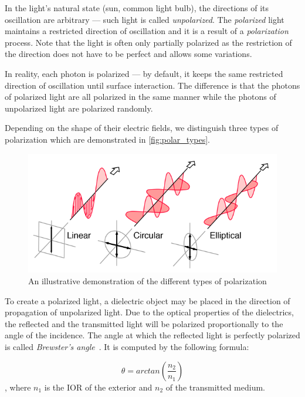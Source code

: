 In the light's natural state (sun, common light bulb), the directions of its oscillation are arbitrary --- such light is called \emph{unpolarized}. The \emph{polarized} light maintains a restricted direction of oscillation and it is a result of a \emph{polarization} process. Note that the light is often only partially polarized as the restriction of the direction does not have to be perfect and allows some variations.

In reality, each photon is polarized --- by default, it keeps the same restricted direction of oscillation until surface interaction. The difference is that the photons of polarized light are all polarized in the same manner while the photons of unpolarized light are polarized randomly. 

Depending on the shape of their electric fields, we distinguish three types of polarization which are demonstrated in \autoref{fig:polar_types}.

\begin{figure}[h]
	\centering
	\includegraphics[width=.7\linewidth]{img/polar_types.png}
	\caption[polar types]{An illustrative demonstration of the different types of polarization \footnotemark}
	\label{fig:polar_types}
\end{figure}

To create a polarized light, a dielectric object may be placed in the direction of propagation of unpolarized light. Due to the optical properties of the dielectrics, the reflected and the transmitted light will be polarized proportionally to the angle of the incidence. The angle at which the reflected light is perfectly polarized is called \emph{Brewster's angle}~\cite{brewster1815laws}. It is computed by the following formula:

\begin{equation}
\theta=arctan(\frac{n_2}{n_1})
\end{equation}
, where $n_1$ is the IOR of the exterior and $n_2$ of the transmitted medium.

